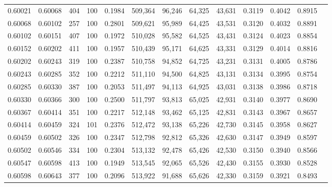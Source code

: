 \begin{tabular}{rrrrrrrrrrrrr}
0.60021 & 0.60068 &   404 & 100 &                                     0.1984 & 509,364 &  96,246 &  64,325 &  43,631 & 0.3119 & 0.4042 & 0.8915 \\
0.60068 & 0.60102 &   257 & 100 &                                     0.2801 & 509,621 &  95,989 &  64,425 &  43,531 & 0.3120 & 0.4032 & 0.8891 \\
0.60102 & 0.60151 &   407 & 100 &                                     0.1972 & 510,028 &  95,582 &  64,525 &  43,431 & 0.3124 & 0.4023 & 0.8854 \\
0.60152 & 0.60202 &   411 & 100 &                                     0.1957 & 510,439 &  95,171 &  64,625 &  43,331 & 0.3129 & 0.4014 & 0.8816 \\
0.60202 & 0.60243 &   319 & 100 &                                     0.2387 & 510,758 &  94,852 &  64,725 &  43,231 & 0.3131 & 0.4005 & 0.8786 \\
0.60243 & 0.60285 &   352 & 100 &                                     0.2212 & 511,110 &  94,500 &  64,825 &  43,131 & 0.3134 & 0.3995 & 0.8754 \\
0.60285 & 0.60330 &   387 & 100 &                                     0.2053 & 511,497 &  94,113 &  64,925 &  43,031 & 0.3138 & 0.3986 & 0.8718 \\
0.60330 & 0.60366 &   300 & 100 &                                     0.2500 & 511,797 &  93,813 &  65,025 &  42,931 & 0.3140 & 0.3977 & 0.8690 \\
0.60367 & 0.60414 &   351 & 100 &                                     0.2217 & 512,148 &  93,462 &  65,125 &  42,831 & 0.3143 & 0.3967 & 0.8657 \\
0.60414 & 0.60459 &   324 & 101 &                                     0.2376 & 512,472 &  93,138 &  65,226 &  42,730 & 0.3145 & 0.3958 & 0.8627 \\
0.60459 & 0.60502 &   326 & 100 &                                     0.2347 & 512,798 &  92,812 &  65,326 &  42,630 & 0.3147 & 0.3949 & 0.8597 \\
0.60502 & 0.60546 &   334 & 100 &                                     0.2304 & 513,132 &  92,478 &  65,426 &  42,530 & 0.3150 & 0.3940 & 0.8566 \\
0.60547 & 0.60598 &   413 & 100 &                                     0.1949 & 513,545 &  92,065 &  65,526 &  42,430 & 0.3155 & 0.3930 & 0.8528 \\
0.60598 & 0.60643 &   377 & 100 &                                     0.2096 & 513,922 &  91,688 &  65,626 &  42,330 & 0.3159 & 0.3921 & 0.8493 \\

\end{tabular}
